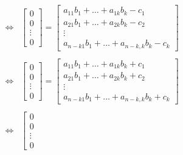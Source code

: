 \documentclass[12pt]{article}
\begin{document}
{\begin{displaymath}
\begin{array}{rcl}
                \\\\
        & \iff &
                \left\lbrack
                \begin{array}{c}
                0 \\
                0 \\
                \vdots \\
                0
                \end{array}
                \right\rbrack
                =
                \left\lbrack
                \begin{array}{c}
                a_{11}b_1 + \ldots + a_{1k}b_k - c_{1} \\
                a_{21}b_1 + \ldots + a_{2k}b_k - c_{2} \\
                \vdots \\
                a_{n-k1}b_1 + \ldots + a_{n-k,k}b_k - c_{k}
                \end{array}
                \right\rbrack
                \\\\
        & \iff &
                \left\lbrack
                \begin{array}{c}
                0 \\
                0 \\
                \vdots \\
                0
                \end{array}
                \right\rbrack
                =
                \left\lbrack
                \begin{array}{c}
                a_{11}b_1 + \ldots + a_{1k}b_k + c_{1} \\
                a_{21}b_1 + \ldots + a_{2k}b_k + c_{2} \\
                \vdots \\
                a_{n-k1}b_1 + \ldots + a_{n-k,k}b_k + c_{k}
                \end{array}
                \right\rbrack
                \\\\
        & \iff &
                \left\lbrack
                \begin{array}{c}
                0 \\
                0 \\
                \vdots \\
                0
                \end{array}

\end{array}
\end{displaymath}}
\end{document}
